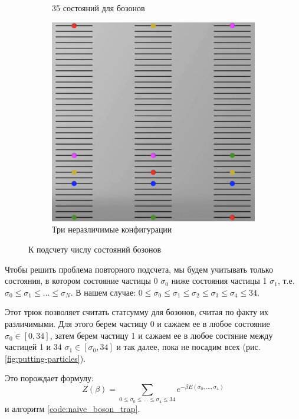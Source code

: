 \begin{figure}[ht]
\begin{subfigure}{0.33\columnwidth}
        \caption{35 состояний для бозонов}
        \label{fig:35-states-example}
    \end{subfigure}
    \begin{subfigure}{0.66\columnwidth}
        \includegraphics[width=\linewidth]{fig/indistinguishable-states}
        \caption{Три неразличимые конфигурации}
        \label{fig:indistinguishable-states-example}
    \end{subfigure}
    \caption{К подсчету числу состояний бозонов}
\end{figure}

Чтобы решить проблема повторного подсчета, мы будем учитывать только состояния, в котором состояние частицы 0 $\sigma_0$ ниже состояния частицы 1 $\sigma_1$, т.е. $\sigma_0 \leq \sigma_1 \leq \dots \leq \sigma_N$.
В нашем случае: $0 \leq \sigma_{0} \leq \sigma_{1} \leq \sigma_{2} \leq \sigma_{3} \leq \sigma_{4} \leq 34$.

Этот трюк позволяет считать статсумму для бозонов, считая по факту их различимыми.
Для этого берем частицу 0 и сажаем ее в любое состояние $\sigma_0 \in [0, 34]$, затем берем частицу 1 и сажаем ее в любое состяние между частицей 1 и 34 $\sigma_1 \in [\sigma_0, 34]$ и так далее, пока не посадим всех (рис. \ref{fig:putting-particles}).

Это порождает формулу:
\begin{equation}
    \label{eq:Z_E-via-sigmas}
    Z(\beta)=\sum_{0 \leq \sigma_{0} \leq \ldots \leq \sigma_{4} \leq 34} e^{-\beta E\left(\sigma_{0}, \ldots, \sigma_{4}\right)}
\end{equation}
и алгоритм \ref{code:naive_boson_trap}.

